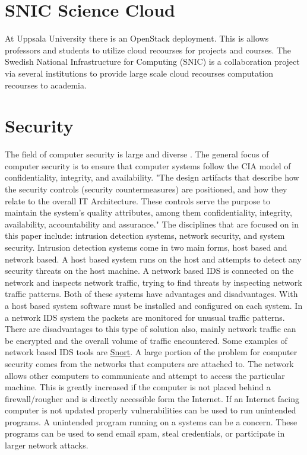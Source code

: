 \documentclass[12pt]{article}
\begin{document}
\section{SNIC Science Cloud}
At Uppsala University there is an OpenStack deployment. This is allows professors and students to utilize cloud recourses for projects and courses.  The Swedish National Infrastructure for Computing (SNIC) is a collaboration project via several institutions to provide large scale cloud recourses computation recourses to academia. 


\section{Security}
The field of computer security is large and diverse \cite{ComputerSecurity}. The general focus of computer security is to ensure that computer systems follow the CIA model of confidentiality, integrity, and availability. "The design artifacts that describe how the security controls (security countermeasures) are positioned, and how they relate to the overall IT Architecture. These controls serve the purpose to maintain the system's quality attributes, among them confidentiality, integrity, availability, accountability and assurance." \cite{it_security_architecture} The disciplines that are focused on in this paper include: intrusion detection systems, network security, and system security.
Intrusion detection systems come in two main forms, host based and network based. A host based system runs on the host and attempts to detect any security threats on the host machine. A network based IDS is connected on the network and inspects network traffic, trying to find threats by inspecting network traffic patterns. Both of these systems have advantages and disadvantages. With a host based system software must be installed and configured on each system. In a network IDS system the packets are monitored for unusual traffic patterns. There are disadvantages to this type of solution also, mainly network traffic can be encrypted and the overall volume of traffic encountered. Some examples of network based IDS tools are \href{https://www.snort.org/}{Snort}.
A large portion of the problem for computer security comes from the networks that computers are attached to. The network allows other computers to communicate and attempt to access the particular machine. This is greatly increased if the computer is not placed behind a firewall/rougher and is directly accessible form the Internet. If an Internet facing computer is not updated properly vulnerabilities can be used to run unintended programs.
A unintended program running on a systems can be a concern. These programs can be used to send email spam, steal credentials, or participate in larger network attacks.
\end{document}
